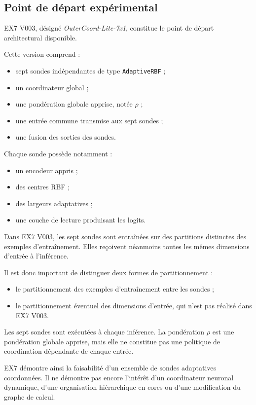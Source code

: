 \documentclass[11pt,a4paper]{article}
\begin{document}
\subsection{Point de départ expérimental}

EX7 V003, désigné \textit{OuterCoord-Lite-7x1}, constitue le point
de départ architectural disponible.

Cette version comprend :
\begin{itemize}
  \item sept sondes indépendantes de type \texttt{AdaptiveRBF} ;
  \item un coordinateur global ;
  \item une pondération globale apprise, notée $\rho$ ;
  \item une entrée commune transmise aux sept sondes ;
  \item une fusion des sorties des sondes.
\end{itemize}

Chaque sonde possède notamment :
\begin{itemize}
  \item un encodeur appris ;
  \item des centres RBF ;
  \item des largeurs adaptatives ;
  \item une couche de lecture produisant les logits.
\end{itemize}

Dans EX7 V003, les sept sondes sont entraînées sur des partitions
distinctes des exemples d'entraînement. Elles reçoivent néanmoins
toutes les mêmes dimensions d'entrée à l'inférence.

Il est donc important de distinguer deux formes de partitionnement :

\begin{itemize}
  \item le partitionnement des exemples d'entraînement entre les sondes ;
  \item le partitionnement éventuel des dimensions d'entrée, qui
        n'est pas réalisé dans EX7 V003.
\end{itemize}

Les sept sondes sont exécutées à chaque inférence. La pondération
$\rho$ est une pondération globale apprise, mais elle ne constitue
pas une politique de coordination dépendante de chaque entrée.

EX7 démontre ainsi la faisabilité d'un ensemble de sondes adaptatives
coordonnées. Il ne démontre pas encore l'intérêt d'un coordinateur
neuronal dynamique, d'une organisation hiérarchique en cores ou
d'une modification du graphe de calcul.
\end{document}
